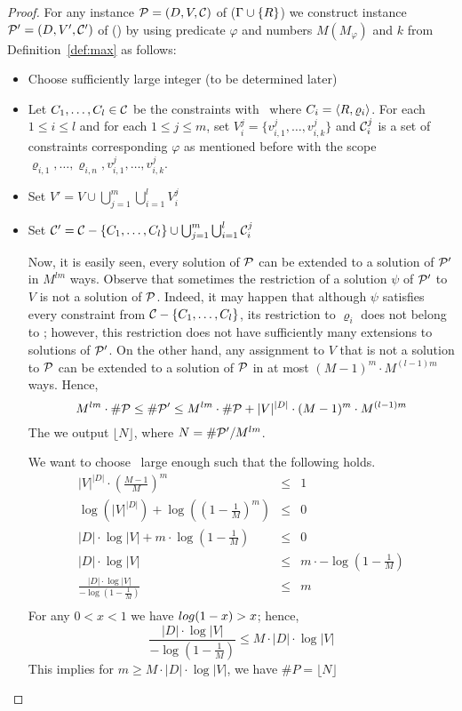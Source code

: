 \begin{proof}
For any instance \(\mathcal{P} = (D,V,\mathcal{C})\) of  \ccsp(\(\Gamma \cup \{{R}\}\)) we
construct instance \(\mathcal{P}' = (D, V',\mathcal{C}')\) of  \ccsp(\mrelset) by using 
predicate \(\varphi\) and numbers \(M(M_\varphi)\) and \(k\) from Definition~\ref{def:max} as follows:
\begin{itemize}
\item 
Choose sufficiently large integer \mm(to be determined later)
\item
Let \(C_1,\dotsc,C_l\in\mathcal{C}\) be the constraints with \mR\ where
\(C_i=\langle R,\varrho_i \rangle\)\@. For each \(1\le i \le l\) and for each \(1\le j\le m\), set
\(V^j_i = \{v^j_{i,1},\dotsc,v^j_{i,k}\}\) and \(\mathcal{C}^j_i\) is a set of constraints
corresponding \(\varphi\) as mentioned before with the scope \(\varrho_{i,1},\dotsc,\varrho_{i,n},
v^j_{i,1},\dotsc,v^j_{i,k}\)\@.
\item Set \(V'=V \cup \bigcup_{j=1}^m \bigcup_{i=1}^l V^j_i\)
\item Set \(\mathcal{C}' = \mathcal{C} - \{{C_1,\dotsc,C_l}\} \cup 
\bigcup_{j=1}^m \bigcup_{i=1}^l \mathcal{C}^j_i\)

Now, it is easily seen, every solution of \(\mathcal{P}\) can be extended to a solution of \(\mathcal{P}'\)
in \(M^{lm}\) ways. Observe that sometimes the restriction of a solution \(\psi\)
of \(\mathcal{P}'\) to \(V\) is not a solution of \(\mathcal{P}\)\@. Indeed, it may happen that
although \(\psi\) satisfies every constraint from \(\mathcal{C} - \{{C_1,\dotsc,C_l}\}\),
its restriction to \(\varrho_i\) does not belong to \mR; however, this restriction does not have
sufficiently many extensions to solutions of \(\mathcal{P}'\)\@.
On the other hand, any assignment to \(V\) that is not a solution to
\(\mathcal{P}\) can be extended to a solution of \(\mathcal{P}\) in at most \((M-1)^m\cdot M^{(l-1)m}\)
ways. Hence, 
\[M^{lm}\cdot \#\mathcal{P} \le  \#\mathcal{P}'  
 \le  M^{lm} \cdot \#\mathcal{P} + |V|^{|D|} \cdot (M-1)^{m} \cdot M ^{(l-1)m}
 \]
The we output \(\lfloor N \rfloor\), where \(N=\#\mathcal{P}'/M^{lm}\)\@.

We want to choose \mm\ large enough such that the following holds.
\begin{eqnarray*}
|V|^{|D|} \cdot \left(\frac{M-1}{M}\right)^{m} & \le & 1 \\
\log (|V|^{|D|}) + \log\left( \left(1-\frac{1}{M}\right)^{m} \right) & \le &  0 \\
|D| \cdot \log |V| + m \cdot \log \left(1-\frac{1}{M}\right) & \le & 0 \\ 
|D| \cdot \log |V| & \le & m \cdot -\log \left(1-\frac{1}{M}\right) \\ 
\frac{|D| \cdot \log |V|}{-\log \left(1-\frac{1}{M}\right)} & \le & m \\
\end{eqnarray*}
For any \(0<x<1\) we have \(\-log (1-x) > x \); hence, 
\[
\frac{|D| \cdot \log |V|}{-\log \left(1-\frac{1}{M}\right)} \le 
M \cdot |D| \cdot \log |V|
\]
This implies for \(m \ge M \cdot |D| \cdot \log |V|\), we have 
\(\#P=\lfloor N \rfloor\)

\end{itemize}
\end{proof}

